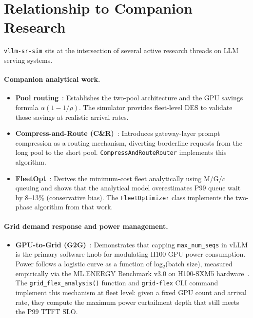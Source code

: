 \documentclass[11pt,a4paper]{article}
\begin{document}
\section{Relationship to Companion Research}
\label{sec:papers}

\texttt{vllm-sr-sim} sits at the intersection of several active
research threads on LLM serving systems.

\paragraph{Companion analytical work.}
\begin{itemize}[nosep]
  \item \textbf{Pool routing}~\citep{chen2026poolrouting}: Establishes
    the two-pool architecture and the GPU savings formula
    $\alpha(1 - 1/\rho)$.  The simulator provides fleet-level DES to
    validate those savings at realistic arrival rates.
  \item \textbf{Compress-and-Route (C\&R)}~\citep{chen2026car}:
    Introduces gateway-layer prompt compression as a routing mechanism,
    diverting borderline requests from the long pool to the short pool.
    \texttt{CompressAndRouteRouter} implements this algorithm.
  \item \textbf{FleetOpt}~\citep{chen2026fleetopt}: Derives the
    minimum-cost fleet analytically using M/G/$c$ queuing and shows that
    the analytical model overestimates P99 queue wait by 8--13\%
    (conservative bias).  The \texttt{FleetOptimizer} class implements
    the two-phase algorithm from that work.
\end{itemize}

\paragraph{Grid demand response and power management.}
\begin{itemize}[nosep]
  \item \textbf{GPU-to-Grid (G2G)}~\citep{hassan2025g2g}:
    Demonstrates that capping \texttt{max\_num\_seqs} in vLLM is the
    primary software knob for modulating H100 GPU power consumption.
    Power follows a logistic curve as a function of log$_2$(batch size),
    measured empirically via the ML.ENERGY Benchmark v3.0 on H100-SXM5
    hardware~\citep{chung2025mlenergy}.  The \texttt{grid\_flex\_analysis()}
    function and \texttt{grid-flex} CLI command implement this mechanism at
    fleet level: given a fixed GPU count and arrival rate, they compute the
    maximum power curtailment depth that still meets the P99 TTFT SLO.
\end{itemize}
\end{document}
